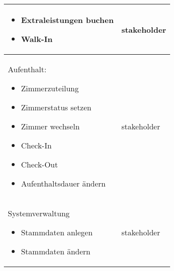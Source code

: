 \documentclass[../../Pflichtenheft.tex]{subfiles}
\begin{document}
\begin{longtable}{|p{7cm}|p{7cm}|}
\begin{itemize}
            \item Extraleistungen buchen
            \item Walk-In
        \end{itemize}
        & stakeholder
        \\ \hline
        Aufenthalt:
        \begin{itemize}
            \item Zimmerzuteilung
            \item Zimmerstatus setzen
            \item Zimmer wechseln
            \item Check-In
            \item Check-Out
            \item Aufenthaltsdauer ändern
        \end{itemize}
        & stakeholder
        \\ \hline
        Systemverwaltung
        \begin{itemize}
            \item Stammdaten anlegen
            \item Stammdaten ändern
        \end{itemize}
        & stakeholder
        \hline
    \end{longtable}
\end{document}
